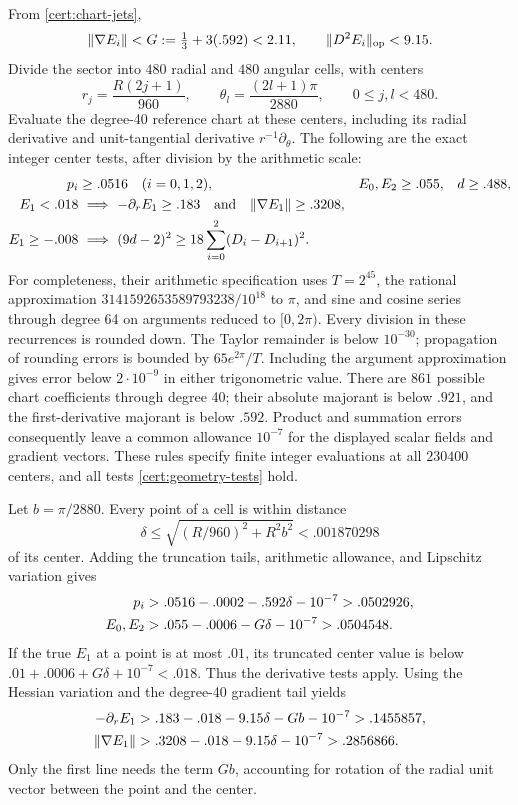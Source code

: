 \documentclass[11pt]{article}
\numberwithin{equation}{section}
\theoremstyle{definition}
\theoremstyle{remark}
\begin{document}
From \eqref{cert:chart-jets},
\begin{equation}\label{cert:E-jets}
 \|\nabla E_i\|<G:=\tfrac13+3(.592)<2.11,\qquad
 \|D^2E_i\|_{\rm op}<9.15.
\end{equation}
Divide the sector into $480$ radial and $480$ angular cells, with centers
\[
 r_j=\frac{R(2j+1)}{960},\qquad
 \theta_l=\frac{(2l+1)\pi}{2880},\qquad 0\leq j,l<480.
\]
Evaluate the degree-40 reference chart at these centers, including its
radial derivative and unit-tangential derivative $r^{-1}\partial_\theta$.
The following are the exact integer center tests, after division by the
arithmetic scale:
\begin{align}
 p_i&\geq.0516\quad(i=0,1,2),& E_0,E_2&\geq.055,& d&\geq.488,
       \label{cert:geometry-tests}\\
 E_1<.018&\ \Longrightarrow\ -\partial_rE_1\geq.183
               \quad\hbox{and}\quad\|\nabla E_1\|\geq.3208,\notag\\
 E_1\geq-.008&\ \Longrightarrow\ (9d-2)^2
                 \geq18\sum_{i=0}^2(D_i-D_{i+1})^2.\notag
\end{align}
For completeness, their arithmetic specification uses $T=2^{45}$, the
rational approximation $3141592653589793238/10^{18}$ to $\pi$, and
sine and cosine series through degree 64 on arguments reduced to $[0,2\pi)$.
Every division in these recurrences is rounded down.  The Taylor remainder
is below $10^{-30}$; propagation of rounding errors is bounded by
$65e^{2\pi}/T$.  Including the argument approximation gives error below
$2\cdot10^{-9}$ in either trigonometric value.  There are $861$ possible
chart coefficients through degree 40; their absolute majorant is below
$.921$, and the first-derivative majorant is below $.592$.  Product and
summation errors consequently leave a common allowance $10^{-7}$ for
the displayed scalar fields and gradient vectors.  These rules specify
finite integer evaluations at all $230400$ centers, and all tests
\eqref{cert:geometry-tests} hold.

Let $b=\pi/2880$.  Every point of a cell is within distance
\[
 \delta\leq\sqrt{(R/960)^2+R^2b^2}<.001870298
\]
of its center.  Adding the truncation tails, arithmetic allowance, and
Lipschitz variation gives
\begin{align}
 p_i&>.0516-.0002-.592\delta-10^{-7}>.0502926,
       \label{cert:positive-five}\\
 E_0,E_2&>.055-.0006-G\delta-10^{-7}>.0504548.\notag
\end{align}
If the true $E_1$ at a point is at most $.01$, its truncated center value is
below $.01+.0006+G\delta+10^{-7}<.018$.  Thus the derivative tests apply.
Using the Hessian variation and the degree-40 gradient tail yields
\begin{align}
 -\partial_rE_1&>.183-.018-9.15\delta-Gb-10^{-7}>.1455857,
                 \label{cert:radial-slope}\\
 \|\nabla E_1\|&>.3208-.018-9.15\delta-10^{-7}>.2856866.\notag
\end{align}
Only the first line needs the term $Gb$, accounting for rotation of the
radial unit vector between the point and the center.
\end{document}
